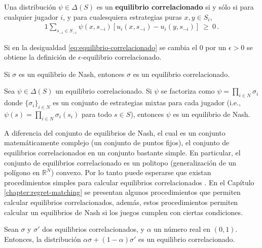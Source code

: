\begin{definition}
\label{def:equilibrio-correlacionado}
Una distribución $\psi\in\Delta(S)$ es un \textbf{equilibrio correlacionado} si y sólo si para cualquier jugador $i$, y para cualesquiera estrategias puras $x, y \in S_i$,
\begin{alignat}{1}
\label{eq:equilibrio-correlacionado}
\sum_{s_{-i}\in S_{-i}} \psi(x,s_{-i}) [ u_i(x,s_{-i}) - u_i(y,s_{-i})]\ \geq\ 0 \,.
\end{alignat}
\end{definition}

Si en la desigualdad \eqref{eq:equilibrio-correlacionado} se cambia el $0$ por un $\epsilon > 0$ se obtiene la definición de $\epsilon$-equilibrio correlacionado.


\begin{theorem}
\label{theo:nash-correlacionado}
Si $\sigma$ es un equilibrio de Nash, entonces $\sigma$ es un equilibrio correlacionado.
\end{theorem}

\begin{theorem}
\label{theo:correlacionado-nash}
Sea $\psi\in\Delta(S)$ un equilibrio correlacionado. Si $\psi$ se factoriza como $\psi=\prod_{i\in N} \sigma_i$ donde $\{\sigma_i\}_{i\in N}$ es un conjunto de estrategias mixtas para cada jugador (i.e., $\psi(s)=\prod_{i \in N} \sigma_i(s_i)$ para todo $s\in S$), entonces $\psi$ es un equilibrio de Nash.
\end{theorem}

A diferencia del conjunto de equilibrios de Nash, el cual es un conjunto matemáticamente complejo (un conjunto de puntos fijos), el conjunto de equilibrios correlacionados en un conjunto bastante simple. En particular, el conjunto de equilibrios correlacionado es un politopo (generalización de un polígono en $\mathbb{R}^N$) convexo. Por lo tanto puede esperarse que existan procedimientos simples para calcular equilibrios correlacionados  \cite{bib:correlated-equilibrium}. En el Capítulo \ref{chapter:regret-matching} se presentan algunos procedimientos que permiten calcular equilibrios correlacionados, además, estos procedimientos permiten calcular un equilibrios de Nash si los juegos cumplen con ciertas condiciones.


\begin{theorem}
\label{theo:correlacionado-linealidad}
Sean $\sigma$ y $\sigma'$ dos equilibrios correlacionados, y $\alpha$ un número real en $(0,1)$. Entonces, la distribución $\alpha\sigma + (1-\alpha)\sigma'$ es un equilibrio correlacionado.
\end{theorem}

